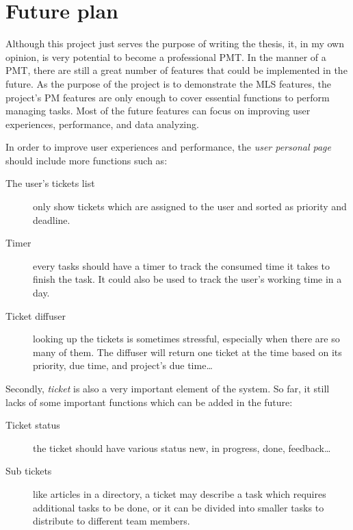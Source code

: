 
\chapter{Future plan} %

\label{ch:future_plan} %

Although this project just serves the purpose of writing the thesis, it, in my own opinion, is very potential to become a professional PMT.
In the manner of a PMT, there are still a great number of features that could be implemented in the future.
As the purpose of the project is to demonstrate the MLS features, the project's PM features are only enough to cover essential functions to perform managing tasks.
Most of the future features can focus on improving user experiences, performance, and data analyzing.

In order to improve user experiences and performance, the \emph{user personal page} should include more functions such as:
\begin{description}
\item[The user's tickets list] only show tickets which are assigned to the user and sorted as priority and deadline.
\item[Timer] every tasks should have a timer to track the consumed time it takes to finish the task.
It could also be used to track the user's working time in a day.
\item[Ticket diffuser] looking up the tickets is sometimes stressful, especially when there are so many of them.
The diffuser will return one ticket at the time based on its priority, due time, and project's due time\dots
\end{description}

Secondly, \emph{ticket} is also a very important element of the system.
So far, it still lacks of some important functions which can be added in the future:
\begin{description}
\item[Ticket status] the ticket should have various status \eg new, in progress, done, feedback\dots
\item[Sub tickets] like articles in a directory, a ticket may describe a task which requires additional tasks to be done, or it can be divided into smaller tasks to distribute to different team members.
\end{description}

